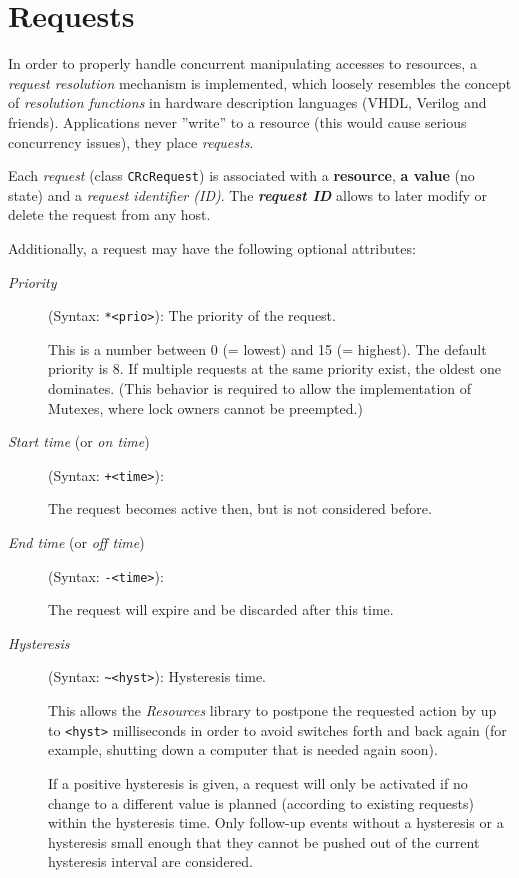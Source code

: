 \documentclass[12pt,english,parskip=half]{scrreprt}
\begin{document}
\section{Requests}
\label{sec:resources-requests}


In order to properly handle concurrent manipulating accesses to resources, a
\emph{request resolution} mechanism is implemented, which loosely
resembles the concept of \emph{resolution functions} in hardware
description languages (VHDL, Verilog and friends).
Applications never ''write'' to a resource (this would cause serious concurrency
issues), they place \emph{requests}.

Each \emph{request} (class \texttt{CRcRequest}) is associated with a
\textbf{resource}, \textbf{a value} (no state) and a \emph{request identifier (ID)}. The
\textbf{\emph{request ID}} allows to later modify or delete the request from any host.

Additionally, a request may have the following optional attributes:

\begin{description}

\item[\emph{Priority}] (Syntax: \texttt{*<prio>}): The priority of the request.

  This is a number between 0 (= lowest) and 15 (= highest). The default
  priority is 8. If multiple requests at the same priority exist,
  the oldest one dominates. (This behavior is required to
  allow the implementation of Mutexes, where lock owners cannot be
  preempted.)

\item[\emph{Start time} (or \emph{on time})] (Syntax: \texttt{+<time>}): \par
  The request becomes active then, but is not considered before.

\item[\emph{End time} (or \emph{off time})] (Syntax: \texttt{-<time>}): \par
  The request will expire and be discarded after this time.

\item[\emph{Hysteresis}] (Syntax: \texttt{\~{}<hyst>}): Hysteresis time.

  This allows the \emph{Resources} library to postpone the requested action by up to
  \texttt{<hyst>} milliseconds in order to avoid switches forth and
  back again (for example, shutting down a computer that is needed again soon).

  If a positive hysteresis is given, a request will only be activated if
  no change to a different value is planned (according to existing
  requests) within the hysteresis time. Only follow-up events without a
  hysteresis or a hysteresis small enough that they cannot be pushed out
  of the current hysteresis interval are considered.

\end{description}
\end{document}
